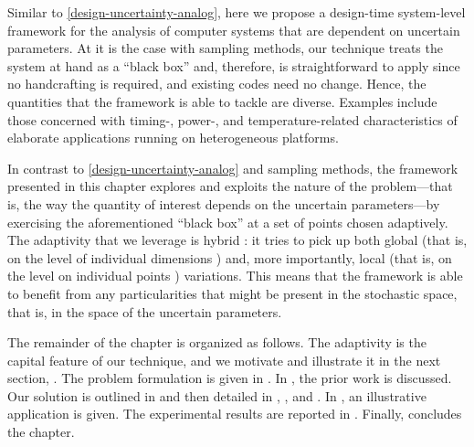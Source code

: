 Similar to \cref{design-uncertainty-analog}, here we propose a design-time
system-level framework for the analysis of computer systems that are dependent
on uncertain parameters. At it is the case with sampling methods, our technique
treats the system at hand as a ``black box'' and, therefore, is straightforward
to apply since no handcrafting is required, and existing codes need no change.
Hence, the quantities that the framework is able to tackle are diverse. Examples
include those concerned with timing-, power-, and temperature-related
characteristics of elaborate applications running on heterogeneous platforms.

In contrast to \cref{design-uncertainty-analog} and sampling methods, the
framework presented in this chapter explores and exploits the nature of the
problem---that is, the way the quantity of interest depends on the uncertain
parameters---by exercising the aforementioned ``black box'' at a set of points
chosen adaptively. The adaptivity that we leverage is hybrid \cite{jakeman2012}:
it tries to pick up both global (that is, on the level of individual dimensions
\cite{klimke2006}) and, more importantly, local (that is, on the level on
individual points \cite{ma2009}) variations. This means that the framework is
able to benefit from any particularities that might be present in the stochastic
space, that is, in the space of the uncertain parameters.

The remainder of the chapter is organized as follows. The adaptivity is the
capital feature of our technique, and we motivate and illustrate it in the next
section, . The problem formulation is given in
. In , the prior work is
discussed. Our solution is outlined in  and then
detailed in , ,
and . In , an
illustrative application is given. The experimental results are reported in
. Finally,  concludes the
chapter.
